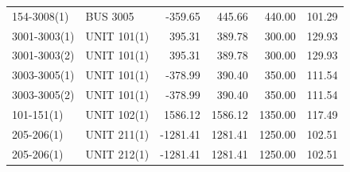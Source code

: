 \documentclass[10pt]{report}
\begin{document}
\begin{table}[H]
{\begin{tabular}{llrrrr}
154-3008(1) & BUS 3005 & -359.65 & 445.66 & 440.00 & 101.29 \\
3001-3003(1) & UNIT 101(1) & 395.31 & 389.78 & 300.00 & 129.93 \\
3001-3003(2) & UNIT 101(1) & 395.31 & 389.78 & 300.00 & 129.93 \\
3003-3005(1) & UNIT 101(1) & -378.99 & 390.40 & 350.00 & 111.54 \\
3003-3005(2) & UNIT 101(1) & -378.99 & 390.40 & 350.00 & 111.54 \\
101-151(1) & UNIT 102(1) & 1586.12 & 1586.12 & 1350.00 & 117.49 \\
205-206(1) & UNIT 211(1) & -1281.41 & 1281.41 & 1250.00 & 102.51 \\
205-206(1) & UNIT 212(1) & -1281.41 & 1281.41 & 1250.00 & 102.51 \\
\bottomrule
\end{tabular}}
\end{table}
\end{document}
